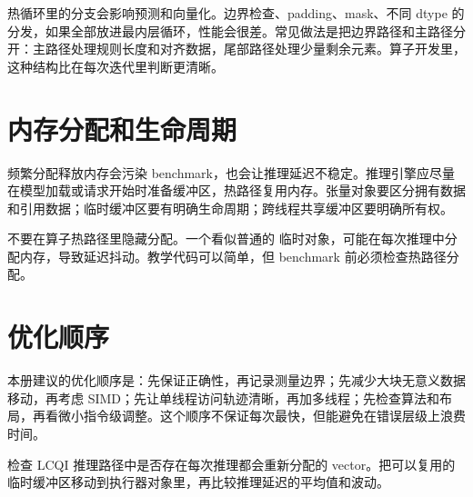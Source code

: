 热循环里的分支会影响预测和向量化。边界检查、padding、mask、不同 dtype 的分发，如果全部放进最内层循环，性能会很差。常见做法是把边界路径和主路径分开：主路径处理规则长度和对齐数据，尾部路径处理少量剩余元素。算子开发里，这种结构比在每次迭代里判断更清晰。

\section{内存分配和生命周期}

频繁分配释放内存会污染 benchmark，也会让推理延迟不稳定。推理引擎应尽量在模型加载或请求开始时准备缓冲区，热路径复用内存。张量对象要区分拥有数据和引用数据；临时缓冲区要有明确生命周期；跨线程共享缓冲区要明确所有权。

\begin{warningbox}
不要在算子热路径里隐藏分配。一个看似普通的  临时对象，可能在每次推理中分配内存，导致延迟抖动。教学代码可以简单，但 benchmark 前必须检查热路径分配。
\end{warningbox}

\section{优化顺序}

本册建议的优化顺序是：先保证正确性，再记录测量边界；先减少大块无意义数据移动，再考虑 SIMD；先让单线程访问轨迹清晰，再加多线程；先检查算法和布局，再看微小指令级调整。这个顺序不保证每次最快，但能避免在错误层级上浪费时间。

\begin{exercisebox}
检查 LCQI 推理路径中是否存在每次推理都会重新分配的 vector。把可以复用的临时缓冲区移动到执行器对象里，再比较推理延迟的平均值和波动。
\end{exercisebox}
